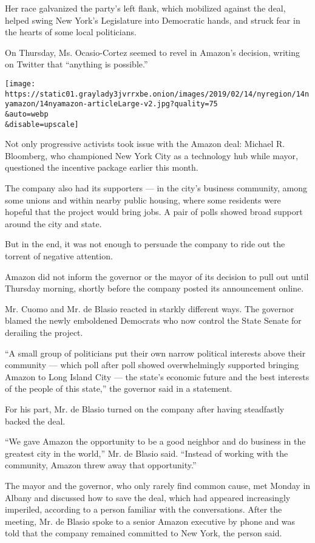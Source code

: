 Her race galvanized the party's left flank, which mobilized against the
deal, helped swing New York's Legislature into Democratic hands, and
struck fear in the hearts of some local politicians.

On Thursday, Ms. Ocasio-Cortez seemed to revel in Amazon's decision,
writing on Twitter that ``anything is possible.''

\texttt{[image: https://static01.graylady3jvrrxbe.onion/images/2019/02/14/nyregion/14nyamazon/14nyamazon-articleLarge-v2.jpg?quality=75\\\&auto=webp\\\&disable=upscale]}

Not only progressive activists took issue with the Amazon deal: Michael
R. Bloomberg, who championed New York City as a technology hub while
mayor, questioned the incentive package earlier this month.

The company also had its supporters --- in the city's business
community, among some unions and within nearby public housing, where
some residents were hopeful that the project would bring jobs. A pair of
polls showed broad support around the city and state.

But in the end, it was not enough to persuade the company to ride out
the torrent of negative attention.

Amazon did not inform the governor or the mayor of its decision to pull
out until Thursday morning, shortly before the company posted its
announcement online.

Mr. Cuomo and Mr. de Blasio reacted in starkly different ways. The
governor blamed the newly emboldened Democrats who now control the State
Senate for derailing the project.

``A small group of politicians put their own narrow political interests
above their community --- which poll after poll showed overwhelmingly
supported bringing Amazon to Long Island City --- the state's economic
future and the best interests of the people of this state,'' the
governor said in a statement.

For his part, Mr. de Blasio turned on the company after having
steadfastly backed the deal.

``We gave Amazon the opportunity to be a good neighbor and do business
in the greatest city in the world,'' Mr. de Blasio said. ``Instead of
working with the community, Amazon threw away that opportunity.''

The mayor and the governor, who only rarely find common cause, met
Monday in Albany and discussed how to save the deal, which had appeared
increasingly imperiled, according to a person familiar with the
conversations. After the meeting, Mr. de Blasio spoke to a senior Amazon
executive by phone and was told that the company remained committed to
New York, the person said.


